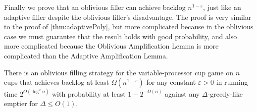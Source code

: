 Finally we prove that an oblivious filler can achieve backlog
$n^{1-\varepsilon}$, just like an adaptive filler despite the
oblivious filler's disadvantage. The proof is very similar to the
proof of \cref{thm:adaptivePoly}, but more complicated because in
the oblivious case we must guarantee that the result holds with
good probability, and also more complicated because the Oblivious
Amplification Lemma is more complicated than the Adaptive
Amplification Lemma. 
\begin{theorem}
  \label{thm:obliviousPoly}
  There is an oblivious filling strategy for the
  variable-processor cup game on $n$ cups that achieves backlog
  at least $\Omega(n^{1-\varepsilon})$ for any constant $\varepsilon
  >0$ in running time $2^{O(\log^2 n)}$ with probability at least
  $1-2^{-\Omega(n)}$ against any $\Delta$-greedy-like emptier for
  $\Delta \le O(1)$.
\end{theorem}
